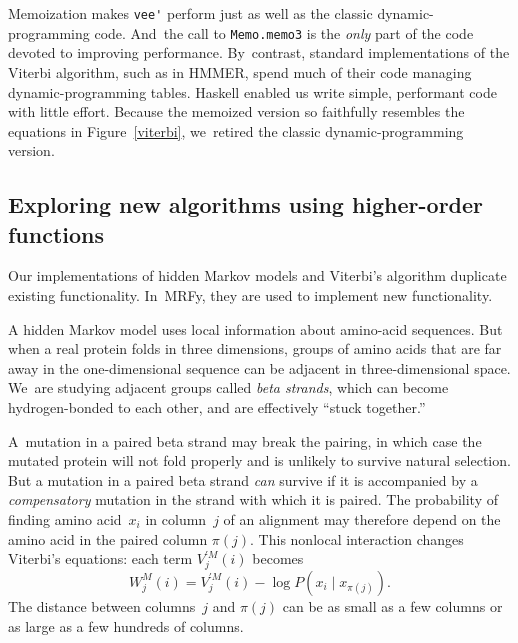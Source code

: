 \documentclass[preprint,nonatbib,blockstyle,nocopyrightspace,times]{sigplanconf}
\newcommand\pairedwith[1]{{\pi(#1)}}
\newcommand\figref[1]{Figure~\ref{#1}}
\newcommand\seclabel[1]{\label{sec:#1}}
\begin{document}
Memoization makes \verb+vee'+ perform just as well as the classic
dynamic-programming code.
And~the call to \texttt{Memo.memo3} is the \emph{only} part of the code
devoted to improving performance.
By~contrast, standard implementations of the Viterbi algorithm, such as in HMMER,
spend much of their code 
managing dynamic-programming tables.
Haskell enabled us write simple, performant code with little effort.
%
Because the memoized version so faithfully resembles the equations in
\figref{viterbi}, we~retired the classic dynamic-programming version.





\subsection{Exploring new algorithms using higher-order functions}

\seclabel{hofs}
\seclabel{mrfy}

Our implementations of hidden Markov models and Viterbi's algorithm
duplicate existing functionality.
In~MRFy, they are used to implement new functionality.

A hidden Markov model uses local information about
amino-acid sequences.
But when a real protein folds in three dimensions, 
groups of amino acids 
that are far away in the one-dimensional sequence can be
adjacent in three-dimensional space.
We~are studying adjacent groups called \emph{beta strands}, which
can become hydrogen-bonded to each other,
and are effectively ``stuck together.''

A~mutation in a paired beta strand may break the pairing, in which
 case the mutated protein will not fold properly and is unlikely to
 survive natural selection.
But a mutation in a paired beta strand \emph{can} survive if it is
 accompanied by a \emph{compensatory} mutation in the strand with which it is
 paired. 
The probability of finding amino acid~$x_i$ in column~$j$ of an alignment may
 therefore depend on the amino acid in the paired column
 $\pairedwith j$.
This nonlocal interaction changes
Viterbi's equations:
each term $V_{j}^{\prime M}(i)$ becomes
$$W_{j}^{M}(i) = V_{j}^{\prime M}(i) - \log P(x_{i} \mid x_{\pairedwith j}).$$
The distance between columns~$j$ and $\pairedwith j$ can be as small
 as a few columns or as large as a few hundreds of columns.
\end{document}

